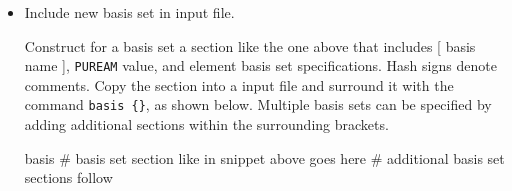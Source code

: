 \begin{itemize}
\item Include new basis set in input file.

Construct for a basis set a section like the one above that includes [ basis name ], \texttt{PUREAM}
value, and element basis set specifications. Hash signs denote comments.
Copy the section into a \PSIfour input file and surround it with the command \texttt{basis \{\}}, 
as shown below.
Multiple basis sets can be specified by adding additional sections within the surrounding brackets.
\begin{Snippet}
basis {
# basis set section like in snippet above goes here
# additional basis set sections follow
}
\end{Snippet}
\end{itemize}



